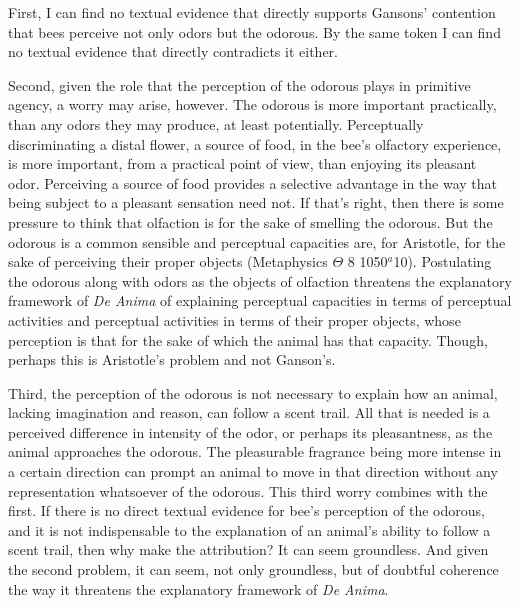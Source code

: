 \documentclass[12pt]{article}
\begin{document}
First, I can find no textual evidence that directly supports Gansons' contention that bees perceive not only odors but the odorous. By the same token I can find no textual evidence that directly contradicts it either. 

Second, given the role that the perception of the odorous plays in primitive agency, a worry may arise, however. The odorous is more important practically, than any odors they may produce, at least potentially. Perceptually discriminating a distal flower, a source of food, in the bee's olfactory experience, is more important, from a practical point of view, than enjoying its pleasant odor. Perceiving a source of food provides a selective advantage in the way that being subject to a pleasant sensation need not. If that's right, then there is some pressure to think that olfaction is for the sake of smelling the odorous. But the odorous is a common sensible and perceptual capacities are, for Aristotle, for the sake of perceiving their proper objects (Metaphysics \( \Theta \) 8 1050\( ^{a} \)10). Postulating the odorous along with odors as the objects of olfaction threatens the explanatory framework of \emph{De Anima} of explaining perceptual capacities in terms of perceptual activities and perceptual activities in terms of their proper objects, whose perception is that for the sake of which the animal has that capacity. Though, perhaps this is Aristotle's problem and not Ganson's.

Third, the perception of the odorous is not necessary to explain how an animal, lacking imagination and reason, can follow a scent trail. All that is needed is a perceived difference in intensity of the odor, or perhaps its pleasantness, as the animal approaches the odorous. The pleasurable fragrance being more intense in a certain direction can prompt an animal to move in that direction without any representation whatsoever of the odorous. This third worry combines with the first. If there is no direct textual evidence for bee's perception of the odorous, and it is not indispensable to the explanation of an animal's ability to follow a scent trail, then why make the attribution? It can seem groundless. And given the second problem, it can seem, not only groundless, but of doubtful coherence the way it threatens the explanatory framework of \emph{De Anima}.
\end{document}
